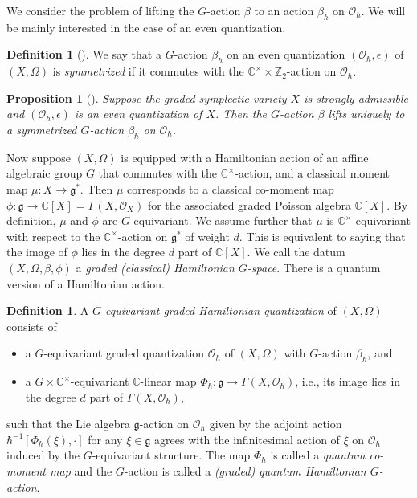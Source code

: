 \documentclass[11pt, a4paper]{amsart}
\newcommand{\C}{\mathbb{C}}
\newcommand{\g}{\mathfrak{g}}
\newcommand{\Z}{\mathbb{Z}}
\newcommand{\fg}{\mathfrak{g}}
\newcommand{\hb}{\hbar}
\newcommand{\cm}{\C^\times}
\newcommand{\OO}{\mathcal{O}}
\newtheorem{Prop}[Thm]{Proposition}
\theoremstyle{definition}
\newtheorem{defi}[Thm]{Definition}
\numberwithin{equation}{section}
\begin{document}
We consider the problem of lifting the $G$-action $\beta$ to an action $\beta_\hb$ on $\OO_\hb$. We will be mainly interested in the case of an even quantization.

\begin{defi}[{\cite[Definition 3.3.4]{LY}}]\label{defn:symm_beta}
	We say that a $G$-action $\beta_\hb$ on an even quantization $(\OO_\hb,\epsilon)$ of $(X,\Omega)$ is \emph{symmetrized} if it commutes with the $\cm \times \Z_2$-action on $\OO_\hb$.
\end{defi}

\begin{Prop}[{\cite[Corollary 3.3.2]{LY}}]
	Suppose the graded symplectic variety $X$ is strongly admissible and $(\OO_\hb, \epsilon)$ is an even quantization of $X$. Then the $G$-action $\beta$ lifts uniquely to a symmetrized $G$-action $\beta_\hb$ on $\OO_\hb$.
\end{Prop}

Now suppose $(X,\Omega)$ is equipped with a Hamiltonian action of an affine algebraic group $G$ that commutes with the $\cm$-action, and a classical moment map $\mu: X \to \fg^*$. Then $\mu$ corresponds to a classical co-moment map $\phi: \fg \to \C[X]=\Gamma(X, \OO_X)$ for the associated graded Poisson algebra $\C[X]$. By definition, $\mu$ and $\phi$ are $G$-equivariant. We assume further that $\mu$ is $\cm$-equivariant with respect to the $\cm$-action on $\fg^*$ of weight $d$. This is equivalent to saying that the image of $\phi$ lies in the degree $d$ part of $\C[X]$. We call the datum $(X, \Omega, \beta, \phi)$ a {\it graded (classical) Hamiltonian $G$-space}. 
There is a quantum version of a Hamiltonian action.

\begin{defi}\label{defn:Hamilt_action_quantization}
	A {\it $G$-equivariant graded Hamiltonian quantization} of $(X, \Omega)$ consists of
	\begin{itemize}
		\item 
			a $G$-equivariant graded quantization $\OO_\hb$ of $(X, \Omega)$ with $G$-action $\beta_\hb$, and
		\item
			a $G \times \cm$-equivariant $\C$-linear map $\Phi_\hb: \g \to \Gamma(X, \OO_\hb)$, i.e., its image lies in the degree $d$ part of $\Gamma(X, \OO_\hb)$,
	\end{itemize}
	such that the Lie algebra $\fg$-action on $\OO_\hb$ given by the adjoint action $\hb^{-1} [\Phi_\hb(\xi), \cdot]$ for any $\xi \in \fg$ agrees with the infinitesimal action of $\xi$ on $\OO_\hb$ induced by the $G$-equivariant structure. The map $\Phi_\hb$ is called a {\it quantum co-moment map} and the $G$-action is called a \emph{(graded) quantum Hamiltonian $G$-action}.
\end{defi}
\end{document}
